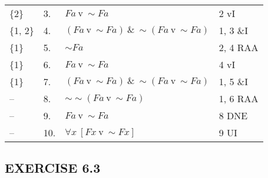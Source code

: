 \documentclass[a4paper,12pt]{article}
\newcommand{\s}{\sim}
\newcommand{\tv}{ \ \textrm{v} \ }
\newcommand{\ta}{ \ \& \ }
\newcommand{\all}{\forall}
\begin{document}
\begin{enumerate}[label=\arabic*,leftmargin=*]
\begin{enumerate}[label=\arabic*.]
\begin{minipage}{\textwidth}
\begin{tabular}{l l l l}
                        \{2\} & 3. & $Fa \tv \s Fa$ & 2 vI\\
                        \{1, 2\} & 4. & $(Fa \tv \s Fa) \ta \s (Fa \tv \s Fa)$ & 1, 3 \&I\\
                        \{1\} & 5. & $\s Fa$ & 2, 4 RAA\\
                        \{1\} & 6. & $Fa \tv \s Fa$ & 4 vI\\
                        \{1\} & 7. & $(Fa \tv \s Fa) \ta \s (Fa \tv \s Fa)$ & 1, 5 \&I\\
                        -- & 8. & $\s \s (Fa \tv \s Fa)$ & 1, 6 RAA\\
                        -- & 9. & $Fa \tv \s Fa$ & 8 DNE\\
                        -- & 10. & $\all x \ [Fx \tv \s Fx]$ & 9 UI\\
                    \end{tabular}
                    \vspace{1em}
                \end{minipage}
            \end{enumerate}

    \end{enumerate}

    \subsection*{EXERCISE 6.3}
\end{document}
